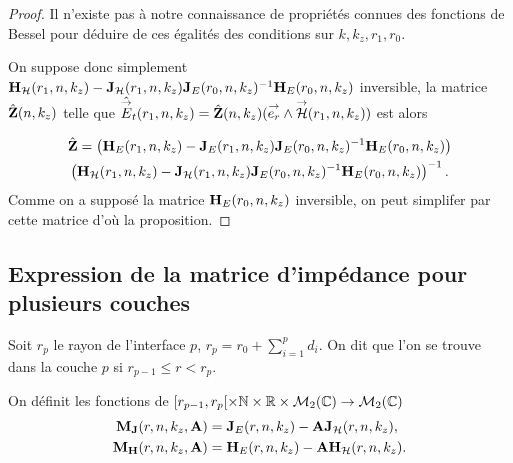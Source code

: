 \begin{proof}
      Il n'existe pas à notre connaissance de propriétés connues des fonctions de Bessel pour déduire de ces égalités des conditions sur \(k,k_z,r_1,r_0\).

      On suppose donc simplement \(\mH_{\cH}(r_1,n,k_z) - \mJ_{\cH}(r_1,n,k_z)\mJ_{E}(r_0,n,k_z)^{-1}\mH_{E}(r_0,n,k_z)\) inversible, la matrice \(\hat\mZ(n,k_z)\) telle que \(\hat\vE_t(r_1,n,k_z) = \hat\mZ(n,k_z) (\vect{e_r}\pvect\vH(r_1,n,k_z))\) est alors

      \begin{multline*}
        \hat \mZ =
        \left(\mH_{E}(r_1,n,k_z) - \mJ_{E}(r_1,n,k_z)\mJ_{E}(r_0,n,k_z)^{-1}\mH_{E}(r_0,n,k_z)\right)
        \\
        \left(\mH_{\cH}(r_1,n,k_z) - \mJ_{\cH}(r_1,n,k_z)\mJ_{E}(r_0,n,k_z)^{-1}\mH_{E}(r_0,n,k_z)\right)^{-1}.
      \end{multline*}
      Comme on a supposé la matrice \(\mH_E(r_0,n,k_z)\) inversible, on peut simplifer par cette matrice d'où la proposition.

    \end{proof}


  \subsection{Expression de la matrice d'impédance pour plusieurs couches}

    \begin{figure}[!hbt]
      \centering
      \begin{tikzpicture}
        
      \end{tikzpicture}
    \end{figure}

    Soit \(r_p\) le rayon de l'interface \(p\), \(r_p = r_0 +\sum_{i=1}^{p} d_{i}\). On dit que l'on se trouve dans la couche \(p\) si \(r_{p-1} \le r < r_p \).

    \begin{defn}
      \label{def:cylindre:matrices_MJ-MH}
      On définit les fonctions de \([r_{p-1}, r_p[\times \NN \times \RR \times \mathcal{M}_{2}(\CC) \rightarrow \mathcal{M}_{2}(\CC)\)
      \begin{align*}
        \mM_{\mJ}(r,n,k_z,\mA) &= \mJ_{E}(r,n,k_z) -  \mA \mJ_{\cH}(r,n,k_z),
        \\
        \mM_{\mH}(r,n,k_z,\mA) &= \mH_{E}(r,n,k_z) -  \mA \mH_{\cH}(r,n,k_z).
      \end{align*}
    \end{defn}

